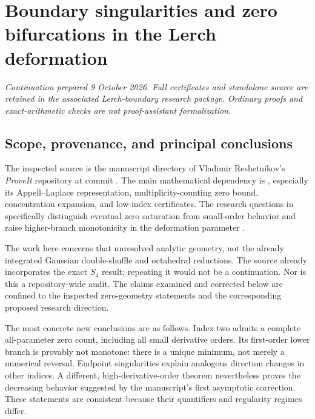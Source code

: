 \chapter{Boundary singularities and zero bifurcations in the Lerch deformation}
\label{ch:lerchbd}
\newcommand{\LBf}[3]{F_{#1,#2}^{#3}}
\noindent\emph{Continuation prepared 9 October 2026. Full certificates and standalone
source are retained in the associated Lerch-boundary research package. Ordinary
proofs and exact-arithmetic checks are not proof-assistant formalization.}

\section{Scope, provenance, and principal conclusions}
The inspected source is the manuscript directory of Vladimir Reshetnikov's \emph{ProveIt} repository at commit . The main mathematical dependency is , especially its Appell--Laplace representation, multiplicity-counting zero bound, concentration expansion, and low-index certificates. The research questions in  specifically distinguish eventual zero saturation from small-order behavior and raise higher-branch monotonicity in the deformation parameter \cite{lerchbd:repo}.

The work here concerns that unresolved analytic geometry, not the already integrated Gaussian double-shuffle and octahedral reductions. The source already incorporates the exact $S_4$ result; repeating it would not be a continuation. Nor is this a repository-wide audit. The claims examined and corrected below are confined to the inspected zero-geometry statements and the corresponding proposed research direction.

The most concrete new conclusions are as follows. Index two admits a complete all-parameter zero count, including all small derivative orders. Its first-order lower branch is provably not monotone: there is a unique minimum, not merely a numerical reversal. Endpoint singularities explain analogous direction changes in other indices. A different, high-derivative-order theorem nevertheless proves the decreasing behavior suggested by the manuscript's first asymptotic correction. These statements are consistent because their quantifiers and regularity regimes differ.

